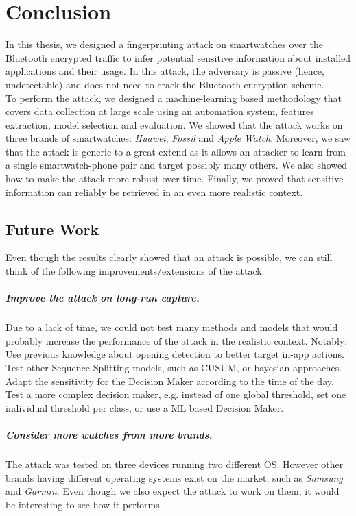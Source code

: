 \chapter{Conclusion}
\label{chap:Conclusion}
In this thesis, we designed a fingerprinting attack on smartwatches over the Bluetooth encrypted traffic to infer potential sensitive information about installed applications and their usage. In this attack, the adversary is passive (hence, undetectable) and does not need to crack the Bluetooth encryption scheme. 
\\

To perform the attack, we designed a machine-learning based methodology that covers data collection at large scale using an automation system, features extraction, model selection and evaluation. We showed that the attack works on three brands of smartwatches: \textit{Huawei}, \textit{Fossil} and \textit{Apple Watch}. Moreover, we saw that the attack is generic to a great extend as it allows an attacker to learn from a single smartwatch-phone pair and target possibly many others. We also showed how to make the attack more robust over time. Finally, we proved that sensitive information can reliably be retrieved in an even more realistic context. 


\section{Future Work}
Even though the results clearly showed that an attack is possible, we can still think of the following improvements/extensions of the attack.

\paragraph{Improve the attack on long-run capture.} Due to a lack of time, we could not test many methods and models that would probably increase the performance of the attack in the realistic context. Notably: Use previous knowledge about opening detection to better target in-app actions. Test other Sequence Splitting models, such as CUSUM, or bayesian approaches. Adapt the sensitivity for the Decision Maker according to the time of the day. Test a more complex decision maker, e.g. instead of one global threshold, set one individual threshold per class, or use a ML based Decision Maker.


\paragraph{Consider more watches from more brands.} The attack was tested on three devices running two different OS. However other brands having different operating systems exist on the market, such as \textit{Samsung} and \textit{Garmin}. Even though we also expect the attack to work on them, it would be interesting to see how it performs.

